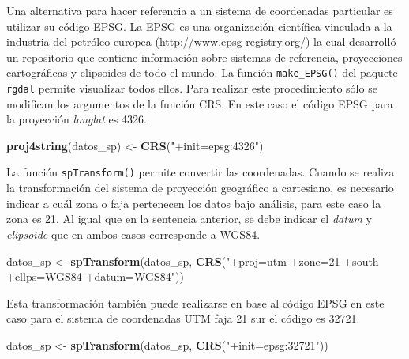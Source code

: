 \documentclass[11pt,b5paper,]{krantz}
\newenvironment{Shaded}{}{}
\newcommand{\KeywordTok}[1]{\textcolor[rgb]{0.00,0.44,0.13}{\textbf{#1}}}
\newcommand{\NormalTok}[1]{#1}
\newcommand{\StringTok}[1]{\textcolor[rgb]{0.25,0.44,0.63}{#1}}
\begin{document}
Una alternativa para hacer referencia a un sistema de coordenadas particular es utilizar su código EPSG. La EPSG es una organización científica vinculada a la industria del petróleo europea (\url{http://www.epsg-registry.org/}) la cual desarrolló un repositorio que contiene información sobre sistemas de referencia, proyecciones cartográficas y elipsoides de todo el mundo. La función \texttt{make\_EPSG()} del paquete \texttt{rgdal} permite visualizar todos ellos. Para realizar este procedimiento sólo se modifican los argumentos de la función CRS. En este caso el código EPSG para la proyección \emph{longlat} es 4326.

\begin{Shaded}
\begin{Highlighting}[]
\KeywordTok{proj4string}\NormalTok{(datos_sp) <-}\StringTok{ }\KeywordTok{CRS}\NormalTok{(}\StringTok{"+init=epsg:4326"}\NormalTok{)}
\end{Highlighting}
\end{Shaded}

La función \texttt{spTransform()} permite convertir las coordenadas. Cuando se realiza la transformación del sistema de proyección geográfico a cartesiano, es necesario indicar a cuál zona o faja pertenecen los datos bajo análisis, para este caso la zona es 21. Al igual que en la sentencia anterior, se debe indicar el \emph{datum} y \emph{elipsoide} que en ambos casos corresponde a WGS84.

\begin{Shaded}
\begin{Highlighting}[]
\NormalTok{datos_sp <-}
\StringTok{  }\KeywordTok{spTransform}\NormalTok{(datos_sp,}
              \KeywordTok{CRS}\NormalTok{(}\StringTok{"+proj=utm +zone=21 +south}
\StringTok{     +ellps=WGS84 +datum=WGS84"}\NormalTok{))}
\end{Highlighting}
\end{Shaded}

Esta transformación también puede realizarse en base al código EPSG en este caso para el sistema de coordenadas UTM faja 21 sur el código es 32721.

\begin{Shaded}
\begin{Highlighting}[]
\NormalTok{datos_sp <-}\StringTok{ }
\StringTok{  }\KeywordTok{spTransform}\NormalTok{(datos_sp, }
              \KeywordTok{CRS}\NormalTok{(}\StringTok{"+init=epsg:32721"}\NormalTok{))}
\end{Highlighting}
\end{Shaded}
\end{document}
